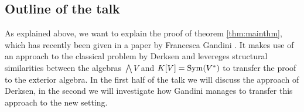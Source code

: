 \documentclass[../main.tex]{subfiles}
\begin{document}
\subsection{Outline of the talk} %
\label{sub:Outline of the talk}
As explained above, we want to explain the proof of theorem \ref{thm:mainthm},
which has recently been given in a paper by Francesca Gandini 
\cite{gandini2021degree}. It makes use of an approach to the classical 
problem by Derksen and levereges structural similarities between the algebras
$\bigwedge V$ and $K[V] = \operatorname{Sym}(V^*)$ to transfer the proof to the 
exterior algebra. In the first half of the talk we will discuss 
the approach of Derksen, in the second we will investigate how Gandini manages
to transfer this approach to the new setting.
\end{document}
